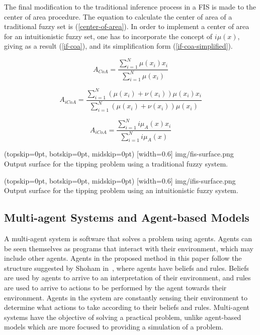 \documentclass{ieeeaccess}
\begin{document}
The final modification to the traditional inference process in a FIS is made to
the center of area procedure. The equation to calculate the center of area of a
traditional fuzzy set is (\ref{center-of-area}). In order to implement a center
of area for an intuitionistic fuzzy set, one has to incorporate the concept of
$i\mu(x)$, giving as a result (\ref{if-coa}), and its simplification form
(\ref{if-coa-simplified}).

\begin{equation}
  \label{center-of-area}
  A_{CoA} = \dfrac{\sum_{i=1}^{N} \mu(x_{i})
    x_{i}}{\sum_{i=1}^{N} \mu(x_{i})}
\end{equation}

\begin{equation}
  \label{if-coa}
  A_{iCoA} = \dfrac{\sum_{i=1}^{N} (\mu(x_{i}) + \nu(x_{i})) \mu(x_{i})
    x_{i}}{\sum_{i=1}^{N} (\mu(x_{i}) + \nu(x_{i})) \mu(x_{i})}
\end{equation}

\begin{equation}
  \label{if-coa-simplified}
  A_{iCoA} = \dfrac{\sum_{i=1}^{N} i\mu_{A}(x) x_{i}}{\sum_{i=1}^{N}
    i\mu_{A}(x)}
\end{equation}

\Figure[](topskip=0pt, botskip=0pt, midskip=0pt)
[width=0.6\linewidth]
{img/fis-surface.png}
{Output surface for the tipping problem using a traditional fuzzy system.
  \label{figure:tipping-output-surface}}

\Figure[](topskip=0pt, botskip=0pt, midskip=0pt)
[width=0.6\linewidth]
{img/ifis-surface.png}
{Output surface for the tipping problem using an intuitionistic fuzzy system.
  \label{figure:ifis-tipping-output-surface}}

\subsection{Multi-agent Systems and Agent-based Models}
\label{subsection:multi-agent-system}


A multi-agent system is software that solves a problem using agents. Agents can
be seen themselves as programs that interact with their environment, which may
include other agents. Agents in the proposed method in this paper follow the
structure suggested by Shoham in~\cite{Shoham1993}, where agents have
beliefs and rules. Beliefs are used by agents to arrive to an interpretation of
their environment, and rules are used to arrive to actions to be performed by
the agent towards their environment. Agents in the system are constantly
sensing their environment to determine what actions to take according to their
beliefs and rules. Multi-agent systems have the objective of solving a practical
problem, unlike agent-based models which are more focused to providing a
simulation of a problem.
\end{document}
